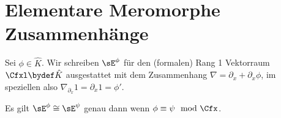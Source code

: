 \chapter{Elementare Meromorphe Zusammenhänge}
\begin{comment}
einführen als Bausteine oder kleinste Meromorphe Zusammenhänge
\end{comment}
\begin{defn}
\cite[1.a]{sabbah_Fourier-local}
Sei $\phi\in\hat K$.
Wir schreiben $\sE^\phi$ für den (formalen) Rang 1 Vektorraum $\Cfxl \bydef
\hat K$ ausgestattet mit dem Zusammenhang $\nabla=\partial_x+\partial_x\phi$,
im speziellen also $\nabla_{\partial_x}1=\partial_x1=\phi'$.\\
\begin{comment}
Also
\begin{align*}
\sE^\phi=\Cfxl & \overset{\partial_x}{\rightarrow} \Cfxl\\
1              & \mapsto \phi'(x)\\
f(x)           & \mapsto f'(x)+f(x)\phi'(x)\\
\end{align*}
\end{comment}
\end{defn}

\begin{bem} \label{bem:FormRang1VR}
\cite[1.a]{sabbah_Fourier-local}
Es gilt $\sE^\phi\cong\sE^\psi$ genau dann wenn $\phi\equiv\psi \mod \Cfx$.
\end{bem}

\begin{comment}
ausformulierte version eines beweises im paper sabbah_Fourier-local.pdf zu
lemma 2.4
\end{comment}

